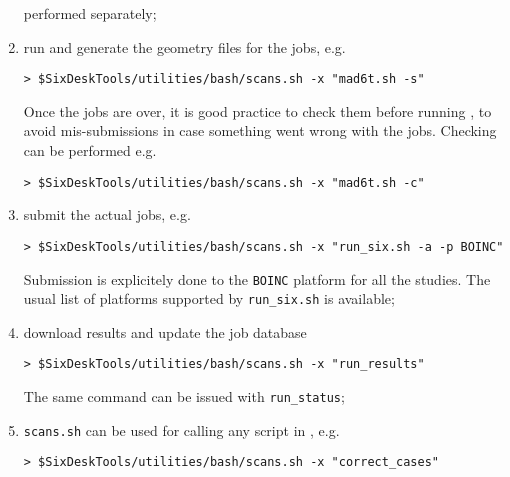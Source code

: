 \begin{enumerate}
performed separately;
\item run \MADX{} and generate the geometry files for the \SIXTRACK{}
  jobs, e.g.
\begin{lstlisting}
> $SixDeskTools/utilities/bash/scans.sh -x "mad6t.sh -s"
\end{lstlisting}
Once the jobs are over, it is good practice to check them before
running \SIXTRACK{}, to avoid mis-submissions in case something
went wrong with the \MADX{} jobs. Checking can be performed e.g.
\begin{lstlisting}
> $SixDeskTools/utilities/bash/scans.sh -x "mad6t.sh -c"
\end{lstlisting}
\item submit the actual \SIXTRACK{} jobs, e.g.
\begin{lstlisting}
> $SixDeskTools/utilities/bash/scans.sh -x "run_six.sh -a -p BOINC"
\end{lstlisting}
Submission is explicitely done to the \texttt{BOINC} platform
for all the studies. The usual list of platforms supported by
\texttt{run\_six.sh} is available;
\item download results and update the job database
\begin{lstlisting}
> $SixDeskTools/utilities/bash/scans.sh -x "run_results"
\end{lstlisting}
The same command can be issued with \texttt{run\_status};
\item \texttt{scans.sh} can be used for calling any script
  in \SIXDESK{}, e.g.
\begin{lstlisting}
> $SixDeskTools/utilities/bash/scans.sh -x "correct_cases"
\end{lstlisting}
\end{enumerate}
